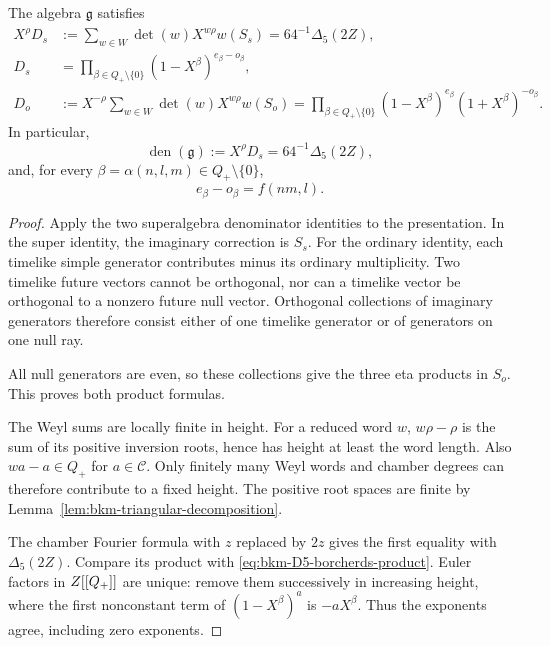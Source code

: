 \begin{theorem}
\label{thm:bkm-denominator-identity}
The algebra $\mathfrak g$ satisfies
\begin{align}
\label{eq:bkm-denominator-identity}
 X^\rho D_s
 &:=\sum_{w\in W}\det(w)X^{w\rho}w(S_s)
   =64^{-1}\Delta_5(2Z),\\
\label{eq:bkm-denominator-product}
 D_s&=\prod_{\beta\in Q_+\setminus\{0\}}
                  (1-X^\beta)^{e_\beta-o_\beta},\\
\label{eq:bkm-ordinary-denominator}
 D_o&:=X^{-\rho}\sum_{w\in W}\det(w)X^{w\rho}w(S_o)
   =\prod_{\beta\in Q_+\setminus\{0\}}
           (1-X^\beta)^{e_\beta}(1+X^\beta)^{-o_\beta}.
\end{align}
In particular,
\begin{equation}
\label{eq:bkm-denominator-equality}
 \operatorname{den}(\mathfrak g):=X^\rho D_s
 =64^{-1}\Delta_5(2Z),
\end{equation}
and, for every $\beta=\alpha(n,l,m)\in Q_+\setminus\{0\}$,
\begin{equation}
\label{eq:bkm-active-multiplicities}
 e_\beta-o_\beta=f(nm,l).
\end{equation}
\end{theorem}
\begin{proof}
Apply the two superalgebra denominator identities
\cite[Statements~6.7$'$--6.8$'$]{GN} to the presentation.
In the super identity, the imaginary correction is $S_s$.
For the ordinary identity, each timelike simple generator
contributes minus its ordinary multiplicity. Two timelike future
vectors cannot be orthogonal, nor can a timelike vector be
orthogonal to a nonzero future null vector. Orthogonal collections
of imaginary generators therefore consist either of one timelike
generator or of generators on one null ray.

All null generators are
even, so these collections give the three eta products in $S_o$.
This proves both product formulas.

The Weyl sums are locally finite in height. For a reduced word $w$,
$w\rho-\rho$ is the sum of its positive inversion roots, hence has
height at least the word length. Also $wa-a\in Q_+$ for
$a\in\mathcal C$. Only finitely many Weyl words and chamber degrees
can therefore contribute to a fixed height. The positive root spaces
are finite by Lemma~\ref{lem:bkm-triangular-decomposition}.

The chamber Fourier formula with $z$ replaced by $2z$ gives the
first equality with $\Delta_5(2Z)$. Compare its product with
\eqref{eq:bkm-D5-borcherds-product}. Euler factors in $Z[[Q_+]]$
are unique: remove them successively in increasing height, where
the first nonconstant term of $(1-X^\beta)^a$ is $-aX^\beta$.
Thus the exponents agree, including zero exponents.
\end{proof}

